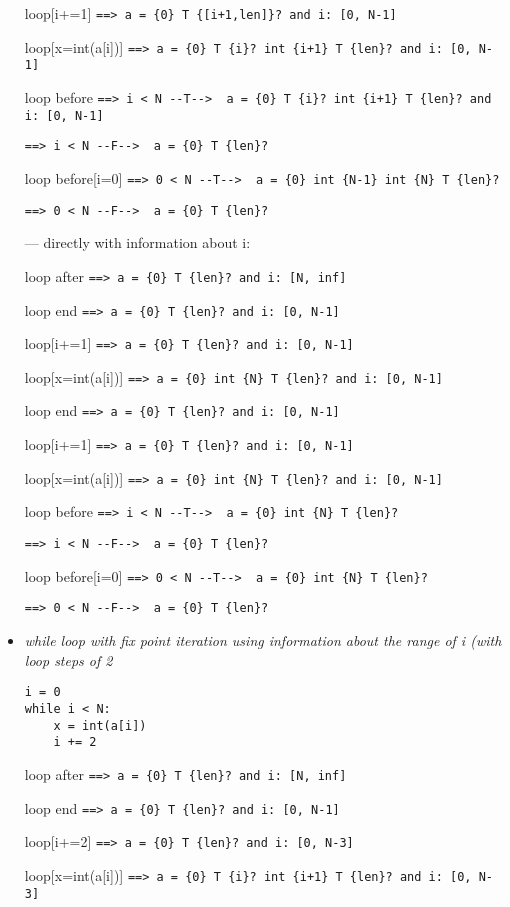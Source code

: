 \documentclass[11pt]{article}
\begin{document}
\begin{itemize}
loop[i+=1] \verb|==> a = {0} T {[i+1,len]}? and i: [0, N-1]|

loop[x=int(a[i])] \verb|==> a = {0} T {i}? int {i+1} T {len}? and i: [0, N-1]|

loop before \verb|==> i < N --T-->  a = {0} T {i}? int {i+1} T {len}? and i: [0, N-1]| 

\verb|==> i < N --F-->  a = {0} T {len}?|

loop before[i=0] \verb|==> 0 < N --T-->  a = {0} int {N-1} int {N} T {len}?| 

\verb|==> 0 < N --F-->  a = {0} T {len}?|

--- directly with information about i:

loop after \verb|==> a = {0} T {len}? and i: [N, inf]|

loop end \verb|==> a = {0} T {len}? and i: [0, N-1]|

loop[i+=1] \verb|==> a = {0} T {len}? and i: [0, N-1]|

loop[x=int(a[i])] \verb|==> a = {0} int {N} T {len}? and i: [0, N-1]|

loop end \verb|==> a = {0} T {len}? and i: [0, N-1]|

loop[i+=1] \verb|==> a = {0} T {len}? and i: [0, N-1]|

loop[x=int(a[i])] \verb|==> a = {0} int {N} T {len}? and i: [0, N-1]|

loop before \verb|==> i < N --T-->  a = {0} int {N} T {len}?| 

\verb|==> i < N --F-->  a = {0} T {len}?|

loop before[i=0] \verb|==> 0 < N --T-->  a = {0} int {N} T {len}?| 

\verb|==> 0 < N --F-->  a = {0} T {len}?|


\item \textit{while loop with fix point iteration using information about the range of i (with loop steps of 2}

\begin{lstlisting}[numbers=none]
i = 0
while i < N:
    x = int(a[i])
    i += 2
\end{lstlisting}

loop after \verb|==> a = {0} T {len}? and i: [N, inf]|

loop end \verb|==> a = {0} T {len}? and i: [0, N-1]|

loop[i+=2] \verb|==> a = {0} T {len}? and i: [0, N-3]|

loop[x=int(a[i])] \verb|==> a = {0} T {i}? int {i+1} T {len}? and i: [0, N-3]|


\end{itemize}
\end{document}
